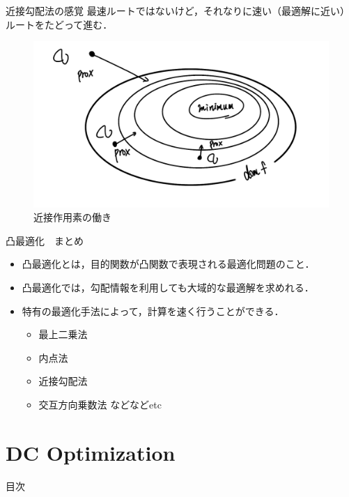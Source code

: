 \documentclass[aspectratio=169, dvipdfmx, 10.5pt]{beamer} %
\begin{document}
\begin{frame}{近接勾配法の感覚}
    最速ルートではないけど，それなりに速い（最適解に近い）ルートをたどって進む．
    \begin{figure}
        \centering
        \includegraphics[keepaspectratio, scale=0.2]{prox.png}
        \caption{近接作用素の働き}
    \end{figure}
\end{frame}

\begin{frame}{凸最適化　まとめ}
    \begin{itemize}
        \item 凸最適化とは，目的関数が凸関数で表現される最適化問題のこと．
        \item 凸最適化では，勾配情報を利用しても大域的な最適解を求めれる．
        \item 特有の最適化手法によって，計算を速く行うことができる．
        \begin{itemize}
            \item 最上二乗法
            \item 内点法
            \item 近接勾配法
            \item 交互方向乗数法 などなどetc
        \end{itemize}
    \end{itemize}
\end{frame}

\section{DC Optimization}
\begin{frame}{目次}
	\tableofcontents[currentsection]
\end{frame}
\end{document}
